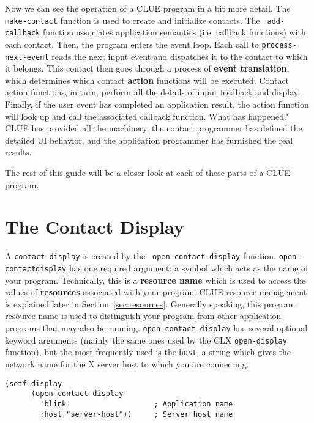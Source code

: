 Now we can see the operation of a CLUE program in a bit more detail. The {\tt
make-contact} function is used to create and initialize contacts. 
The {\tt
add-callback} function  associates application semantics
(i.e. callback
functions) with each contact. Then, the program enters the event loop. Each call
to {\tt process-next-event}  reads the next input event and dispatches it to the
contact to which it belongs. This contact then goes through a process of {\bf
event translation}, which determines which
contact {\bf action} functions will be
executed. Contact action functions, in turn, perform all the details of input
feedback and display. Finally, if the user event has completed an application
result, the action function will look up and call the associated callback
function. What has happened? CLUE has provided all the machinery, the contact
programmer has defined the detailed UI behavior, and the application programmer has
furnished the real results.

The rest of this guide will be a closer look at each of these parts of a CLUE
program.

\section{The Contact Display\label{sec:contact-display}}
A {\tt contact-display} is created by the {\tt
open-contact-display} function.  {\tt op\-en\--con\-tact\-dis\-play} has one required
argument: a symbol which acts as the name of your program.  Technically, this is
a {\bf resource name} which is used to access the values of
{\bf resources} associated with your program.  CLUE resource
management is explained later in Section~\ref{sec:resources}.  Generally
speaking, this program resource name is used to distinguish your program from
other application programs that may also be running. {\tt open-contact-display}
has several optional keyword arguments (mainly the same ones used by the CLX
{\tt open-display} function), but the most frequently used is the {\tt host}, a
string which gives the network name for the X server host to which you are
connecting.

\begin{verbatim}
(setf display
      (open-contact-display
        'blink                    ; Application name
        :host "server-host"))     ; Server host name
\end{verbatim}


